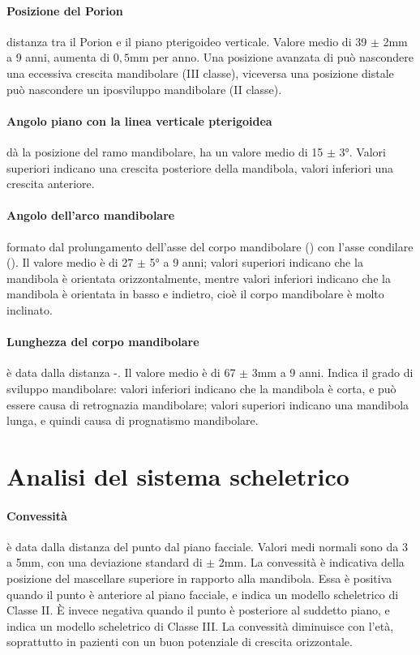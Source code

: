 \paragraph{Posizione del Porion} distanza tra il Porion e il piano pterigoideo verticale. Valore medio di 39 $\pm$ 2mm a 9 anni, aumenta di $0,5$mm per anno. Una posizione avanzata di  può nascondere una eccessiva crescita mandibolare (III classe), viceversa una posizione distale può nascondere un iposviluppo mandibolare (II classe).

\paragraph{Angolo piano  con la linea verticale pterigoidea} dà la posizione del ramo mandibolare, ha un valore medio di 15 $\pm$ 3°. Valori superiori indicano una crescita posteriore della mandibola, valori inferiori una crescita anteriore.

\paragraph{Angolo dell'arco mandibolare} formato dal prolungamento dell'asse del corpo mandibolare () con l'asse condilare (). Il valore medio è di 27 $\pm$ 5° a 9 anni; valori superiori indicano che la mandibola è orientata orizzontalmente, mentre valori inferiori indicano che la mandibola è orientata in basso e indietro, cioè il corpo mandibolare è molto inclinato.

\paragraph{Lunghezza del corpo mandibolare} è data dalla distanza -. Il valore medio è di 67 $\pm$ 3mm a 9 anni. Indica il grado di sviluppo mandibolare: valori inferiori indicano che la mandibola è corta, e può essere causa di retrognazia mandibolare; valori superiori indicano una mandibola lunga, e quindi causa di prognatismo mandibolare.

\section{Analisi del sistema scheletrico}
\paragraph{Convessità} è data dalla distanza del punto  dal piano facciale. Valori medi normali sono da 3 a 5mm, con una deviazione standard di $\pm$ 2mm. La convessità è indicativa della posizione del mascellare superiore in rapporto alla mandibola. Essa è positiva quando il punto  è anteriore al piano facciale, e indica un modello scheletrico di Classe II. È invece negativa quando il punto  è posteriore al suddetto piano, e indica un modello scheletrico di Classe III. La convessità diminuisce con l'età, soprattutto in pazienti con un buon potenziale di crescita orizzontale.

